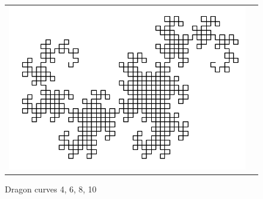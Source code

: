\documentclass[a4paper, 11pt]{book}
\begin{document}
\begin{figure}
\begin{tabular}{cc}
\includegraphics[scale=0.4]{dragon-10.png} \\
\end{tabular}
\caption{Dragon curves 4, 6, 8, 10}
\end{figure}
\end{document}

